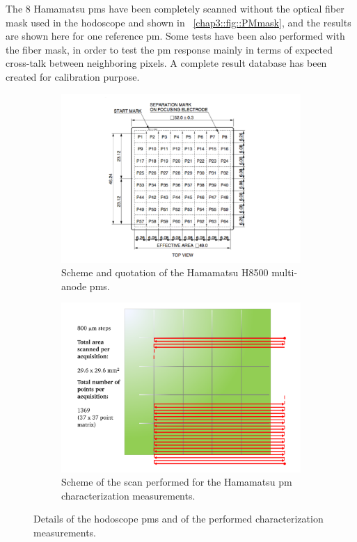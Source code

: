 The 8 Hamamatsu \glspl{pm} have been completely scanned without the optical fiber mask used in the hodoscope and shown in \figurename~\ref{chap3::fig::PMmask}, and the results are shown here for one reference \gls{pm}. Some tests have been also performed with the fiber mask, in order to test the \gls{pm} response mainly in terms of expected cross-talk between neighboring pixels. A complete result database has been created for calibration purpose.

\begin{figure}
\begin{subfigure}[t]{.5\textwidth}
\centering
\includegraphics[width=1\textwidth]{03_GraphicFiles/chapter3_CLaRySproto/Hodoscope/PM_specs_mod.pdf}
\caption{Scheme and quotation of the Hamamatsu H8500 multi-anode \glspl{pm}.}
\label{chap3::fig::hodoPMscheme}
\end{subfigure}
\begin{subfigure}[t]{.5\textwidth}
\centering
\includegraphics[width=1\textwidth]{03_GraphicFiles/chapter3_CLaRySproto/Hodoscope/scan_logic.pdf}
\caption{Scheme of the scan performed for the Hamamatsu \gls{pm} characterization measurements.}
\label{chap3::fig::hodoPMscanScheme}
\end{subfigure}
\caption{Details of the hodoscope \glspl{pm} and of the performed characterization measurements.}
\label{chap3::fig::hodoScanDetails}
\end{figure}


